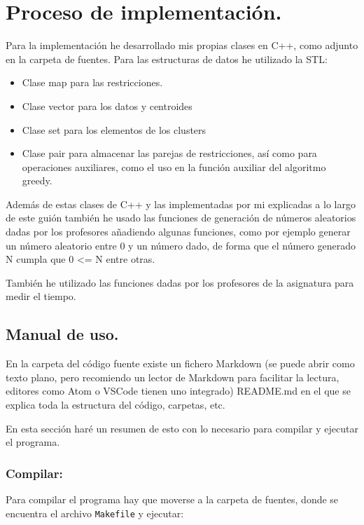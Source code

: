\documentclass[12pt, spanish]{article}
\begin{document}
\section{Proceso de implementación.}

Para la implementación he desarrollado mis propias clases en C++, como adjunto en la carpeta de fuentes. Para las estructuras de datos he utilizado la STL:

\begin{itemize}
	\item Clase map para las restricciones.
	\item Clase vector para los datos y centroides
	\item Clase set para los elementos de los clusters
	\item Clase pair para almacenar las parejas de restricciones, así como para operaciones auxiliares, como el uso en la función auxiliar del algoritmo greedy.
\end{itemize}

Además de estas clases de C++ y las implementadas por mi explicadas a lo largo de este guión también he usado las funciones de generación de números aleatorios dadas por los profesores añadiendo algunas funciones, como por ejemplo generar un número aleatorio entre 0 y un número dado, de forma que el número generado N cumpla que 0 <= N entre otras.

También he utilizado las funciones dadas por los profesores de la asignatura para medir el tiempo.


\subsection{Manual de uso.}

En la carpeta del código fuente existe un fichero Markdown (se puede abrir como texto plano, pero recomiendo un lector de Markdown para facilitar la lectura, editores como Atom o VSCode tienen uno integrado) README.md en el que se explica toda la estructura del código, carpetas, etc.

En esta sección haré un resumen de esto con lo necesario para compilar y ejecutar el programa.

\subsubsection{Compilar:}

Para compilar el programa hay que moverse a la carpeta de fuentes, donde se encuentra el archivo \texttt{Makefile} y ejecutar:
\end{document}
